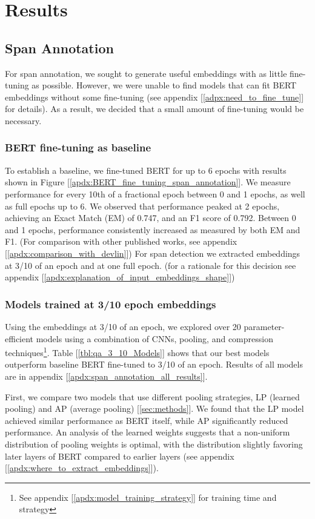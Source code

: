 \section{Results}

\subsection{Span Annotation}
For span annotation, we sought to generate useful embeddings with as little fine-tuning as possible. However, we were unable to find models that can fit BERT embeddings without some fine-tuning (see appendix [\ref{adpx:need_to_fine_tune}] for details). As a result, we decided that a small amount of fine-tuning would be necessary.

\subsubsection{BERT fine-tuning as baseline}
To establish a baseline, we fine-tuned BERT for up to 6 epochs with results shown in Figure [\ref{apdx:BERT_fine_tuning_span_annotation}]. We measure performance for every 10th of a fractional epoch between 0 and 1 epochs, as well as full epochs up to 6. We observed that performance peaked at 2 epochs, achieving an Exact Match (EM) of 0.747, and an F1 score of 0.792. Between 0 and 1 epochs, performance consistently increased as measured by  both EM and F1. (For comparison with other published works, see appendix [\ref{apdx:comparison_with_devlin}]) For span detection we extracted embeddings at 3/10 of an epoch and at one full epoch. (for a rationale for this decision see appendix [\ref{apdx:explanation_of_input_embeddings_shape}])

\subsubsection{Models trained at 3/10 epoch embeddings}
Using the embeddings at 3/10 of an epoch, we explored over 20 parameter-efficient models using a combination of CNNs, pooling, and compression techniques\footnote{See appendix [\ref{apdx:model_training_strategy}] for training time and strategy}. Table [\ref{tbl:qa_3_10_Models}] shows that our best models outperform baseline BERT fine-tuned to 3/10 of an epoch. Results of all models are in appendix [\ref{apdx:span_annotation_all_results}].

First, we compare two models that use different pooling strategies, LP (learned pooling) and AP (average pooling) [\ref{sec:methods}]. We found that the LP model achieved similar performance as BERT itself, while AP significantly reduced performance. An analysis of the learned weights suggests that a non-uniform distribution of pooling weights is optimal, with the distribution slightly favoring later layers of BERT compared to earlier layers (see appendix [\ref{apdx:where_to_extract_embeddings}]).


